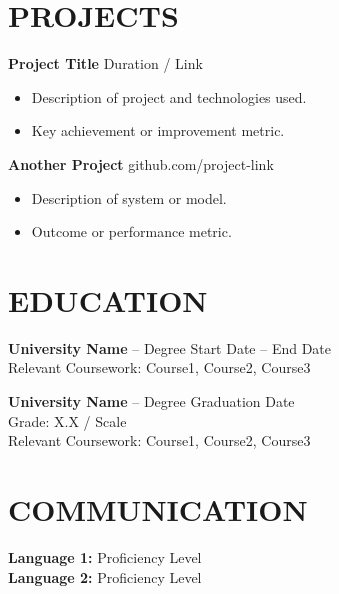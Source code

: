 \documentclass[a4paper,10pt]{article}
\begin{document}
\section*{PROJECTS}

\textbf{Project Title} \hfill Duration / Link
\begin{itemize}[leftmargin=*]
    \item Description of project and technologies used.
    \item Key achievement or improvement metric.
\end{itemize}

\textbf{Another Project} \hfill github.com/project-link
\begin{itemize}[leftmargin=*]
    \item Description of system or model.
    \item Outcome or performance metric.
\end{itemize}

\section*{EDUCATION}

\textbf{University Name} – Degree \hfill Start Date – End Date\\
Relevant Coursework: Course1, Course2, Course3

\vspace{5pt}

\textbf{University Name} – Degree \hfill Graduation Date\\
Grade: X.X / Scale\\
Relevant Coursework: Course1, Course2, Course3

\section*{COMMUNICATION}

\textbf{Language 1:} Proficiency Level\\
\textbf{Language 2:} Proficiency Level
\end{document}
